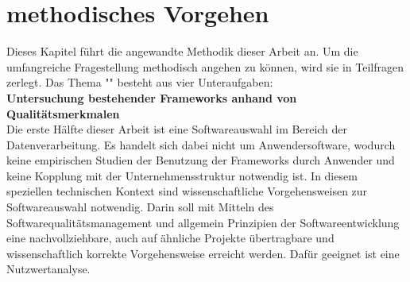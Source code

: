 \chapter{methodisches Vorgehen}
\label{chapter:methodik}

Dieses Kapitel führt die angewandte Methodik dieser Arbeit an.
Um die umfangreiche Fragestellung methodisch angehen zu können, wird sie in Teilfragen zerlegt.
Das Thema "\titel{}" besteht aus vier Unteraufgaben:\\

\textbf{Untersuchung bestehender Frameworks anhand von Qualitätsmerkmalen}\\
Die erste Hälfte dieser Arbeit ist eine Softwareauswahl im Bereich der Datenverarbeitung.
Es handelt sich dabei nicht um Anwendersoftware, wodurch keine empirischen Studien der Benutzung der Frameworks durch Anwender und keine Kopplung mit der Unternehmensstruktur notwendig ist.
In diesem speziellen technischen Kontext sind wissenschaftliche Vorgehensweisen zur Softwareauswahl notwendig.
Darin soll mit Mitteln des Softwarequalitätsmanagement und allgemein Prinzipien der Softwareentwicklung eine nachvollziehbare, auch auf ähnliche Projekte übertragbare und wissenschaftlich korrekte Vorgehensweise erreicht werden.
Dafür geeignet ist eine Nutzwertanalyse.

